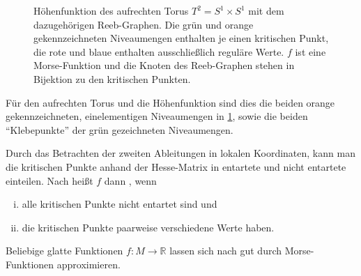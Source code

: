 \begin{figure}
	\caption[Höhenfunktion des aufrechten Torus mit dem dazugehörigen Reeb-Graphen]{Höhenfunktion des aufrechten Torus $T^2=S^1 \times S^1$ mit dem dazugehörigen Reeb-Graphen. Die grün und orange gekennzeichneten Niveaumengen enthalten je einen kritischen Punkt, die rote und blaue enthalten ausschließlich reguläre Werte. $f$ ist eine Morse-Funktion und die Knoten des Reeb-Graphen stehen in Bijektion zu den kritischen Punkten.}\label{fig:torus_reeb}
\end{figure}
Für den aufrechten Torus und die Höhenfunktion sind dies die beiden orange gekennzeichneten, einelementigen Niveaumengen in \cref{fig:torus_reeb}, sowie die beiden \enquote{Klebepunkte} der grün gezeichneten Niveaumengen.

Durch das Betrachten der zweiten Ableitungen in lokalen Koordinaten, kann man die kritischen Punkte anhand der Hesse-Matrix in entartete und nicht entartete einteilen.
Nach \textcite{compTopo} heißt $f$ dann , wenn
\begin{enumerate}[(i)]
	\item alle kritischen Punkte nicht entartet sind und
	\item\label{enum:def:morse:2} die kritischen Punkte paarweise verschiedene Werte haben.
\end{enumerate}
Beliebige glatte Funktionen $f \colon M \to \mathbb{R}$ lassen sich nach \textcite[Corr.~6.8]{MilnorMorse} gut durch Morse-Funktionen approximieren.

